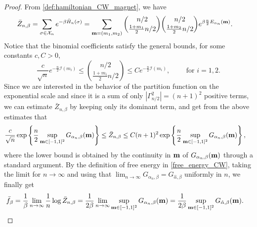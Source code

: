 \documentclass[11pt,oneside]{amsart}
\numberwithin{equation}{section}  %
\theoremstyle{plain}
\theoremstyle{remark}
\def \bm {{\bf m}}
\begin{document}
\begin{proof}
From \eqref{def:hamiltonian_CW_magnet}, we have
\begin{align*}
    \bar{Z}_{n,\beta}&= \sum_{\sigma\in \mathcal{X}_n} e^{-\beta \bar{H}_n(\sigma)} =\sum_{\bm=(m_1,m_2)} \binom{n/2}{\frac{1+m_1}{2} n/2} \binom{n/2}{\frac{1+m_2}{2} n/2} e^{\beta\frac{n}{2} E_{\alpha_n}(\bm)}.
\end{align*}
Notice that the binomial coefficients satisfy the general bounds, for some constants $c,C>0$,
\begin{equation}\label{StirBound}
\frac{c}{\sqrt{n}}e^{- \frac{n}{2}\mathcal{I}(m_i)}\le\binom{n/2}{\frac{1+m_i}{2} n/2}\le Ce^{- \frac{n}{2}\mathcal{I}(m_i)},\qquad \mbox{ for } i=1,2.
\end{equation}
Since we are interested in the behavior of the partition function on the exponential scale and since it is a sum of only $|\Gamma_{n/2}^2 |= (n+1)^2$ positive terms, we can estimate $\bar{Z}_{n,\beta}$ by keeping only its
dominant term, and get from the above estimates that
%
\begin{align*}
  \frac{c}{\sqrt{n}}\exp\left \{\frac{n}{2} \sup_{\bm \in [-1,1]^2} G_{\alpha_n,\beta} (\bm) \right \} \leq \bar{Z}_{n,\beta} 
    & \leq C(n+1)^2 \exp\left \{\frac{n}{2} \sup_{\bm \in [-1,1]^2} G_{\alpha_n,\beta} (\bm) \right \},
\end{align*}
where the lower bound is obtained by the continuity in $\bm$ of $G_{\alpha_n,\beta}(\bm)$ through a standard argument.
By the definition of free energy in \eqref{free_energy_CW}, taking the limit for $n\to\infty$ 
and using that $\lim_{n \to \infty}G_{\alpha_n,\beta}=G_{\hat\alpha, \beta}$ uniformly in $n$,
we finally get
\begin{align*}
    \bar{f}_{\beta} &= \frac{1}{\beta}\lim_{n \to \infty} \frac{1}{n} \log \bar{Z}_{n,\beta} =
    \frac{1}{2\beta}\lim_{n\to\infty} \sup_{\bm \in [-1,1]^2} G_{\alpha_n,\beta} (\bm) 
    = \frac{1}{2\beta}\sup_{\bm \in [-1,1]^2} G_{\hat\alpha,\beta} (\bm).
\end{align*}
\end{proof}
\end{document}
